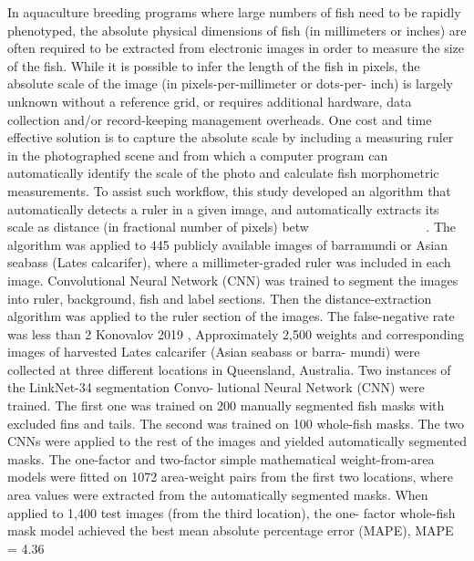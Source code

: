 In aquaculture breeding programs where large numbers of fish need to be rapidly phenotyped, the absolute physical dimensions of fish (in millimeters or inches) are often required to be extracted from electronic images in order to measure the size of the fish. While it is possible to infer the length of the fish in pixels, the absolute scale of the image (in pixels-per-millimeter or dots-per- inch) is largely unknown without a reference grid, or requires additional hardware, data collection and/or record-keeping management overheads. One cost and time effective solution is to capture the absolute scale by including a measuring ruler in the photographed scene and from which a computer program can automatically identify the scale of the photo and calculate fish morphometric measurements. To assist such workflow, this study developed an algorithm that automatically detects a ruler in a given image, and automatically extracts its scale as distance (in fractional number of pixels) betw􏱜􏱜􏰬 􏰦􏱬􏱜 􏰪􏰣􏰴􏱜􏰪􏰱􏰤 􏱼􏰪􏲂􏱙􏰣􏲂􏰦􏲋􏱟􏰬 􏰨􏲂􏰪􏲀􏰤. The algorithm was applied to 445 publicly available images of barramundi or Asian seabass (Lates calcarifer), where a millimeter-graded ruler was included in each image. Convolutional Neural Network (CNN) was trained to segment the images into ruler, background, fish and label sections. Then the distance-extraction algorithm was applied to the ruler section of the images. The false-negative rate was less than 2%
Konovalov 2019 \cite{Konovalov2019AutomaticWE},
Approximately 2,500 weights and corresponding images of harvested Lates calcarifer (Asian seabass or barra- mundi) were collected at three different locations in Queensland, Australia. Two instances of the LinkNet-34 segmentation Convo- lutional Neural Network (CNN) were trained. The first one was trained on 200 manually segmented fish masks with excluded fins and tails. The second was trained on 100 whole-fish masks. The two CNNs were applied to the rest of the images and yielded automatically segmented masks. The one-factor and two-factor simple mathematical weight-from-area models were fitted on 1072 area-weight pairs from the first two locations, where area values were extracted from the automatically segmented masks. When applied to 1,400 test images (from the third location), the one- factor whole-fish mask model achieved the best mean absolute percentage error (MAPE), MAPE = 4.36%



